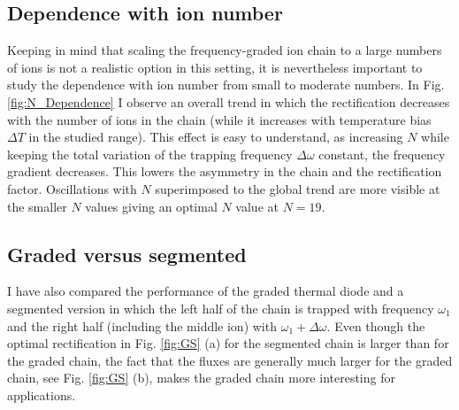 \subsection{Dependence with ion number\label{IN}}
%
Keeping in mind that scaling the frequency-graded ion chain  to a large numbers of ions is not a realistic option in this setting,
it is nevertheless important to
study the dependence with ion number from small to moderate numbers.  In Fig. \ref{fig:N_Dependence} I observe an overall trend in which the rectification decreases with the number of ions in the chain (while it increases with temperature bias $\Delta T$ in the studied range). This effect is easy to understand, as increasing $N$
while keeping the total variation of the trapping frequency $\Delta \omega$ constant, the frequency gradient  decreases. This
lowers  the  asymmetry in the chain and the rectification factor. Oscillations with $N$ superimposed to the global trend are more visible at the smaller $N$ values giving  an optimal $N$ value at $N=19$.

\subsection{Graded versus segmented\label{GS}}
%
I have also compared the performance of the graded thermal diode and a segmented version in which the left half of the chain is trapped with frequency $\omega_1$ and the right half (including the middle ion) with $\omega_1+\Delta \omega$. Even though the optimal rectification  in Fig. \ref{fig:GS} (a)  for the segmented chain is larger than for the graded chain, the fact that the fluxes are generally much larger for the graded chain, see Fig. \ref{fig:GS} (b), makes the graded chain more interesting for applications.



